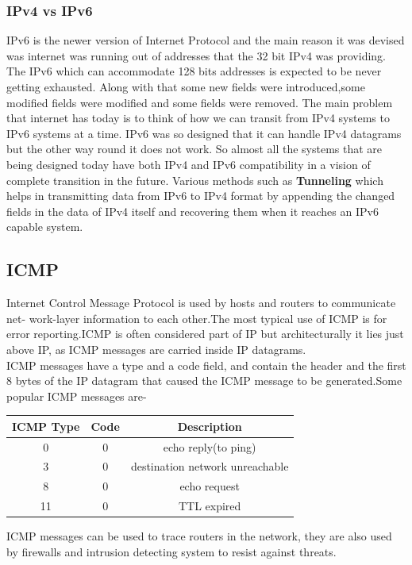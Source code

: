 \documentclass{article}
\begin{document}
\subsubsection{IPv4 vs IPv6}
IPv6 is the newer version of Internet Protocol and the main reason it was devised was internet was running out of addresses that the 32 bit IPv4 was providing. The IPv6 which can accommodate 128 bits addresses is expected to be never getting exhausted. Along with that some new fields were introduced,some modified fields were modified and some fields were removed. The main problem that internet has today is to think of how we can transit from IPv4 systems to IPv6 systems at a time. IPv6 was so designed that it can handle IPv4 datagrams but the other way round it does not work. So almost all the systems that are being designed today have both IPv4 and IPv6 compatibility in a vision of complete transition in the future. Various methods such as \textbf{Tunneling} which helps in transmitting data from IPv6 to IPv4 format by appending the changed fields in the data of IPv4 itself and recovering them when it reaches an IPv6 capable system.\\
\subsection{ICMP}
Internet Control Message Protocol is used by hosts and routers to communicate net- work-layer information to each other.The most typical use of ICMP is for error reporting.ICMP is often considered part of IP but architecturally it lies just above IP, as ICMP messages are carried inside IP datagrams.\\
ICMP messages have a type and a code field, and contain the header and the first 8 bytes of the IP datagram that caused the ICMP message to be generated.Some popular ICMP messages are-
\begin{center}
    \begin{tabular}{|c|c|c|}
    \hline
         ICMP Type & Code & Description  \\ \hline
         0  & 0 & echo reply(to ping)\\
         3 & 0 & destination network unreachable\\
         8 & 0 & echo request\\
         11 & 0 & TTL expired\\
    \hline    
    \end{tabular}
\end{center}
ICMP messages can be used to trace routers in the network, they are also used by firewalls and intrusion detecting system to resist against threats.\\
\end{document}
